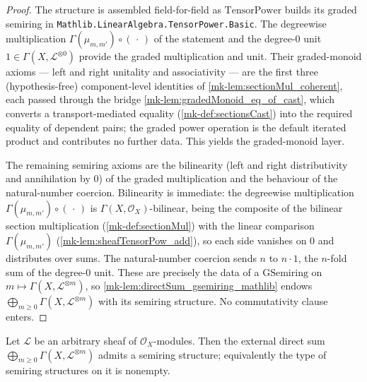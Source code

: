 \begin{proof}
  \leanok
  The structure is assembled field-for-field as \(\mathrm{TensorPower}\) builds its
  graded semiring in \texttt{Mathlib.LinearAlgebra.TensorPower.Basic}. The
  degreewise multiplication \(\Gamma(\mu_{m,m'}) \circ (\,\cdot\,)\) of the
  statement and the degree-\(0\) unit \(1 \in \Gamma(X, \mathcal{L}^{\otimes 0})\)
  provide the graded multiplication and unit. Their graded-monoid axioms --- left
  and right unitality and associativity --- are the first three (hypothesis-free)
  component-level identities of \ref{mk-lem:sectionMul_coherent}, each passed through
  the bridge \ref{mk-lem:gradedMonoid_eq_of_cast}, which converts a
  transport-mediated equality (\ref{mk-def:sectionsCast}) into the required equality
  of dependent pairs; the graded power operation is the default iterated product
  and contributes no further data. This yields the graded-monoid layer.

  The remaining semiring axioms are the bilinearity (left and right distributivity
  and annihilation by \(0\)) of the graded multiplication and the behaviour of the
  natural-number coercion. Bilinearity is immediate: the degreewise multiplication
  \(\Gamma(\mu_{m,m'}) \circ (\,\cdot\,)\) is \(\Gamma(X,\mathcal{O}_X)\)-bilinear,
  being the composite of the bilinear section multiplication (\ref{mk-def:sectionMul})
  with the linear comparison \(\Gamma(\mu_{m,m'})\)
  (\ref{mk-lem:sheafTensorPow_add}), so each side vanishes on \(0\) and distributes
  over sums. The natural-number coercion sends \(n\) to \(n \cdot 1\), the
  \(n\)-fold sum of the degree-\(0\) unit. These are precisely the data of a
  \(\mathrm{GSemiring}\) on \(m \mapsto \Gamma(X, \mathcal{L}^{\otimes m})\), so
  \ref{mk-lem:directSum_gsemiring_mathlib} endows
  \(\bigoplus_{m \ge 0} \Gamma(X, \mathcal{L}^{\otimes m})\) with its semiring
  structure. No commutativity clause enters.
\end{proof}

\begin{lemma}\label{mk-lem:sectionGradedRing_semiring_nonempty}
  \leanok

  Let \(\mathcal{L}\) be an arbitrary sheaf of \(\mathcal{O}_X\)-modules. Then the
  external direct sum \(\bigoplus_{m \ge 0} \Gamma(X,\mathcal{L}^{\otimes m})\)
  admits a semiring structure; equivalently the type of semiring structures on it
  is nonempty.
\end{lemma}

